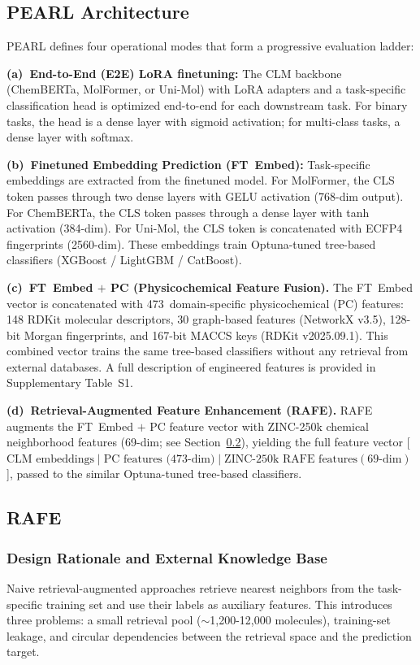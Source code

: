\documentclass[9pt,twocolumn,conference]{IEEEtran}
\begin{document}
\subsection{PEARL Architecture}
PEARL defines four operational modes that form a progressive evaluation ladder:

\textbf{(a)~End-to-End (E2E) LoRA finetuning:}
The CLM backbone (ChemBERTa, MolFormer, or Uni-Mol) with LoRA adapters and a task-specific classification head is optimized end-to-end for each downstream task. For binary tasks, the head is a dense layer with sigmoid activation;
for multi-class tasks, a dense layer with softmax.

\textbf{(b)~Finetuned Embedding Prediction (FT~Embed):}
Task-specific embeddings are extracted from the finetuned model. For MolFormer, the CLS token passes through two dense layers with GELU activation (768-dim output). For ChemBERTa, the CLS token passes through a dense layer with tanh activation (384-dim). For Uni-Mol, the CLS token is concatenated with ECFP4 fingerprints (2560-dim).
These embeddings train Optuna-tuned \cite{akiba2019optuna} tree-based classifiers (XGBoost / LightGBM / CatBoost).

\textbf{(c)~FT~Embed $+$ PC (Physicochemical Feature Fusion).}
The FT~Embed vector is concatenated with 473~domain-specific physicochemical (PC) features: 148 RDKit molecular descriptors, 30 graph-based features (NetworkX v3.5), 128-bit Morgan fingerprints, and 167-bit MACCS keys (RDKit v2025.09.1). This combined vector trains the same tree-based classifiers without any retrieval from external databases. A full description of engineered features is provided in Supplementary Table~S1.

\textbf{(d)~Retrieval-Augmented Feature Enhancement (RAFE).}
RAFE augments the FT~Embed $+$ PC feature vector with ZINC-250k chemical neighborhood features (69-dim; see Section~\ref{sec:rafe}), yielding the full feature vector [$\text{CLM embeddings} \mid \text{PC features (473-dim)} \mid \text{ZINC-250k RAFE features} (69\text{-dim})$], passed to the similar Optuna-tuned tree-based classifiers.
\subsection{RAFE}\label{sec:rafe}
\subsubsection{Design Rationale and External Knowledge Base} \label{sec:zinc_rationale}
Naive retrieval-augmented approaches retrieve nearest neighbors from the task-specific training set and use their labels as auxiliary features. This introduces three problems: a small retrieval pool ($\sim$1,200-12,000 molecules), training-set leakage, and circular dependencies between the retrieval space and the prediction target.
\end{document}
